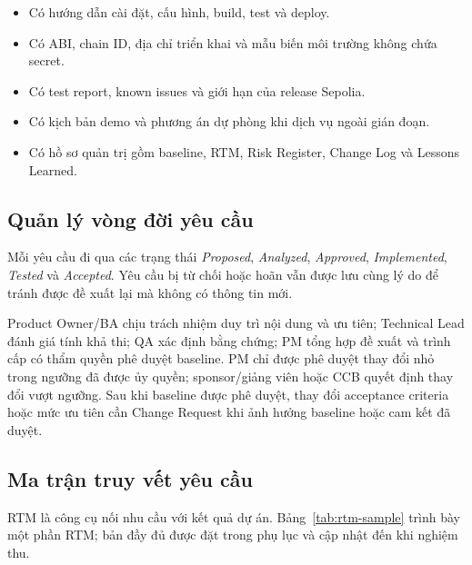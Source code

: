 \begin{itemize}
  \item Có hướng dẫn cài đặt, cấu hình, build, test và deploy.
  \item Có ABI, chain ID, địa chỉ triển khai và mẫu biến môi trường không chứa secret.
  \item Có test report, known issues và giới hạn của release Sepolia.
  \item Có kịch bản demo và phương án dự phòng khi dịch vụ ngoài gián đoạn.
  \item Có hồ sơ quản trị gồm baseline, RTM, Risk Register, Change Log và Lessons Learned.
\end{itemize}

\subsection{Quản lý vòng đời yêu cầu}

Mỗi yêu cầu đi qua các trạng thái \textit{Proposed}, \textit{Analyzed}, \textit{Approved}, \textit{Implemented}, \textit{Tested} và \textit{Accepted}. Yêu cầu bị từ chối hoặc hoãn vẫn được lưu cùng lý do để tránh được đề xuất lại mà không có thông tin mới.

Product Owner/BA chịu trách nhiệm duy trì nội dung và ưu tiên; Technical Lead đánh giá tính khả thi; QA xác định bằng chứng; PM tổng hợp đề xuất và trình cấp có thẩm quyền phê duyệt baseline. PM chỉ được phê duyệt thay đổi nhỏ trong ngưỡng đã được ủy quyền; sponsor/giảng viên hoặc CCB quyết định thay đổi vượt ngưỡng. Sau khi baseline được phê duyệt, thay đổi acceptance criteria hoặc mức ưu tiên cần Change Request khi ảnh hưởng baseline hoặc cam kết đã duyệt.

\subsection{Ma trận truy vết yêu cầu}

RTM là công cụ nối nhu cầu với kết quả dự án. Bảng~\ref{tab:rtm-sample} trình bày một phần RTM; bản đầy đủ được đặt trong phụ lục và cập nhật đến khi nghiệm thu.

